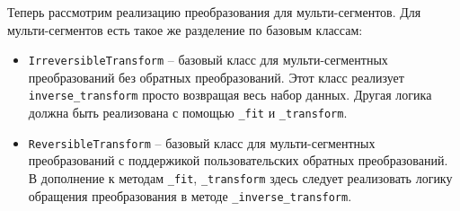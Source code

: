 \documentclass[%
	11pt,
	a4paper,
	utf8,
		]{article}
\begin{document}
Теперь рассмотрим реализацию преобразования для мульти-сегментов. Для мульти-сегментов есть такое же разделение по базовым классам:
\begin{itemize}
	\item \verb|IrreversibleTransform| -- базовый класс для мульти-сегментных преобразований без обратных преобразований. Этот класс реализует \verb|inverse_transform| просто возвращая весь набор данных. Другая логика должна быть реализована с помощью \verb|_fit| и \verb|_transform|.
	
	\item \verb|ReversibleTransform| -- базовый класс для мульти-сегментных преобразований с поддержикой пользовательских обратных преобразований. В дополнение к методам \verb|_fit|, \verb|_transform| здесь следует реализовать логику обращения преобразования в методе \verb|_inverse_transform|. 
\end{itemize}
\end{document}
